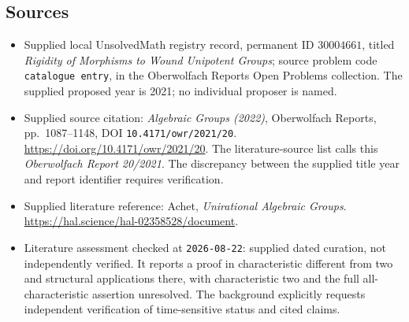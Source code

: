 \documentclass[11pt]{article}
\begin{document}
\subsection{Sources}
\begin{itemize}
\item Supplied local UnsolvedMath registry record, permanent ID \(30004661\), titled \emph{Rigidity of Morphisms to Wound Unipotent Groups}; source problem code \texttt{catalogue entry}, in the Oberwolfach Reports Open Problems collection. The supplied proposed year is 2021; no individual proposer is named.
\item Supplied source citation: \emph{Algebraic Groups (2022)}, Oberwolfach Reports, pp.\ 1087--1148, DOI \texttt{10.4171/owr/2021/20}. \url{https://doi.org/10.4171/owr/2021/20}. The literature-source list calls this \emph{Oberwolfach Report 20/2021}. The discrepancy between the supplied title year and report identifier requires verification.
\item Supplied literature reference: Achet, \emph{Unirational Algebraic Groups}. \url{https://hal.science/hal-02358528/document}.
\item Literature assessment checked at \texttt{2026-08-22}: supplied dated curation, not independently verified. It reports a proof in characteristic different from two and structural applications there, with characteristic two and the full all-characteristic assertion unresolved. The background explicitly requests independent verification of time-sensitive status and cited claims.
\end{itemize}
\end{document}

